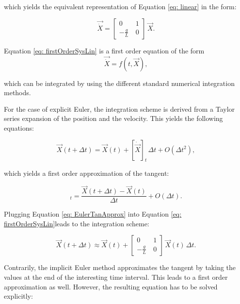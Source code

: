 \documentclass[12pt,bibstyle=none,pagenumberinfooter]{ifmdocument}
\begin{document}
which yields the equivalent representation of Equation \ref{eq: linear} in the form:

\begin{equation}
    \Vec{\Dot{X}} = \begin{bmatrix}
        0 & 1 \\ -\frac{g}{L}\ & 0
    \end{bmatrix} \, \Vec{X}.
    \label{eq: firstOrderSysLin}
\end{equation}

Equation \ref{eq: firstOrderSysLin} is a first order equation of the form
\begin{equation}
    \Vec{\Dot{X}} = f(t,\Vec{X}),
    \label{eq: GeneralIntForm}
\end{equation}

which can be integrated by using the different standard numerical integration methods.

For the case of explicit Euler, the integration scheme is derived from a Taylor series expansion of the position and the velocity. This yields the following equations:

\begin{equation}
    \Vec{X}(t+\Delta t) = \Vec{X}(t) + [\Dot{\Vec{X}}]_t\,\Delta t + {O(\Delta t^2)},
\end{equation}

which yields a first order approximation of the tangent:

\begin{equation}
    [\Vec{\Dot{X}}]_t = \frac{\Vec{X}(t+\Delta t)-\Vec{X}(t)}{\Delta t} + O\left(\Delta t\right).
    \label{eq: EulerTanApprox}
\end{equation}

Plugging Equation \ref{eq: EulerTanApprox} into Equation \ref{eq: firstOrderSysLin}leads to the integration scheme:

\begin{equation}
    \Vec{X}(t+\Delta t) \approx \Vec{X}(t) + \begin{bmatrix}
        0 & 1 \\ -\frac{g}{L}\ & 0
    \end{bmatrix} \, \Vec{X}(t) \, \Delta t.
\end{equation}

Contrarily, the implicit Euler method approximates the tangent by taking the values at the end of the interesting time interval. This leads to a first order approximation as well. However, the resulting equation has to be solved explicitly:
\end{document}
